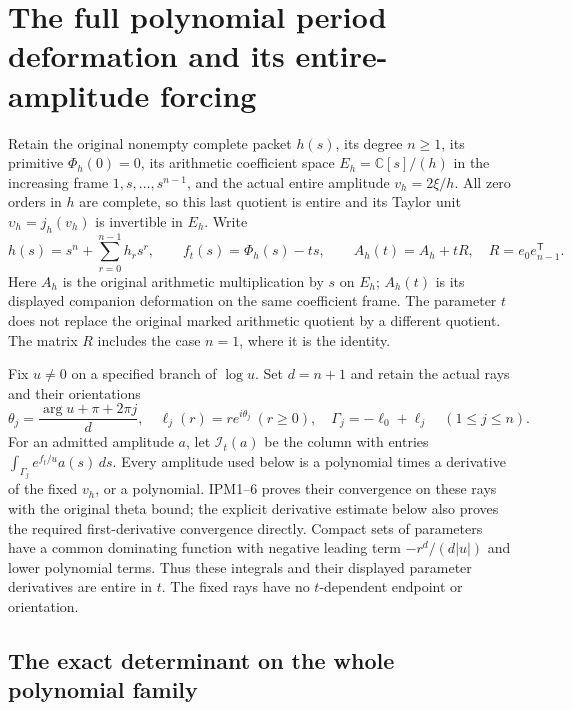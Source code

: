 \documentclass[11pt,a4paper]{article}
\begin{document}


\section{The full polynomial period deformation and its entire-amplitude forcing}
\label{GraphV3:sec:pde-full-deformation}

Retain the original nonempty complete packet $h(s)$, its degree $n\geq1$,
its primitive $\Phi_h(0)=0$, its arithmetic coefficient space
$E_h=\mathbb{C}[s]/(h)$ in the increasing frame $1,s,\ldots,s^{n-1}$,
and the actual entire amplitude $v_h=2\xi/h$. All zero orders in $h$
are complete, so this last quotient is entire and its Taylor unit
$\upsilon_h=j_h(v_h)$ is invertible in $E_h$. Write
\[
 h(s)=s^n+\sum_{r=0}^{n-1}h_rs^r,\qquad
 f_t(s)=\Phi_h(s)-ts,\qquad
 A_h(t)=A_h+tR,\quad R=e_0e_{n-1}^{\mathsf T}.
 \tag{PDE1}
\]
Here $A_h$ is the original arithmetic multiplication by $s$ on $E_h$;
$A_h(t)$ is its displayed companion deformation on the same coefficient
frame. The parameter $t$ does not replace the original marked arithmetic
quotient by a different quotient. The matrix $R$ includes the case
$n=1$, where it is the identity.

Fix $u\ne0$ on a specified branch of $\log u$. Set $d=n+1$ and retain
the actual rays and their orientations
\[
 \theta_j=\frac{\arg u+\pi+2\pi j}{d},\quad
 \ell_j(r)=re^{i\theta_j}\ (r\geq0),\quad
 \Gamma_j=-\ell_0+\ell_j\quad(1\leq j\leq n).
 \tag{PDE2}
\]
For an admitted amplitude $a$, let $\mathcal I_t(a)$ be the column with
entries $\int_{\Gamma_j}e^{f_t/u}a(s)\,ds$. Every amplitude used below is
a polynomial times a derivative of the fixed $v_h$, or a polynomial.
IPM1--6 proves their convergence on these rays with the original theta
bound; the explicit derivative estimate below also proves the required
first-derivative convergence directly. Compact sets of parameters have
a common dominating function with negative leading term
$-r^d/(d|u|)$ and lower polynomial terms. Thus these integrals and their
displayed parameter derivatives are entire in $t$. The fixed rays have
no $t$-dependent endpoint or orientation.

\subsection{The exact determinant on the whole polynomial family}
\end{document}
